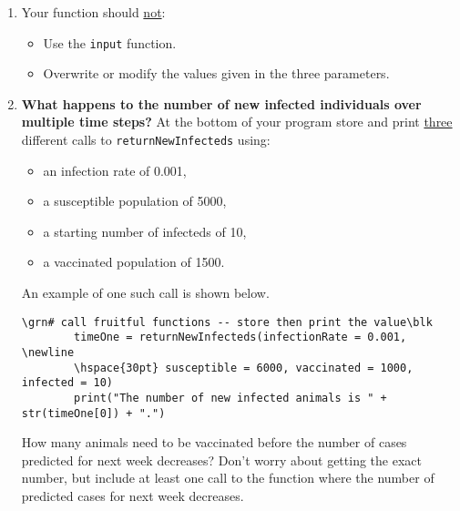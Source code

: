 \documentclass[10pt]{article}
\newcommand{\blk}{\color{black}}
\newcommand{\grn}{\color{darkgreen}}
\begin{document}
\begin{enumerate}
        \item Your function should \uline{not}:
            \begin{itemize}
                \item Use the {\tt input} function.
                \item Overwrite or modify the values given in the three parameters.
            \end{itemize}

        \item {\bf What happens to the number of new infected individuals over multiple time steps?} \newline At the bottom of your program store and print \uline{three}
            different calls to  {\tt returnNewInfecteds} using:
            \begin{itemize}
            \item an infection rate of 0.001, 
            \item a susceptible population of 5000, 
            \item a starting number of infecteds of 10,
            \item a vaccinated population of 1500.
            \end{itemize}
            
        An example of one such call is shown below.
\begin{Verbatim}[commandchars=\\\{\}]
        \grn# call fruitful functions -- store then print the value\blk
        timeOne = returnNewInfecteds(infectionRate = 0.001, \newline
        \hspace{30pt} susceptible = 6000, vaccinated = 1000, infected = 10)  
        print("The number of new infected animals is " + str(timeOne[0]) + ".")
\end{Verbatim}
            How many animals need to be vaccinated before the number of cases predicted for next week decreases? Don't worry about getting the exact number, but include at least one call to the function where the number of predicted cases for next week decreases.
            

\end{enumerate}
\end{document}
